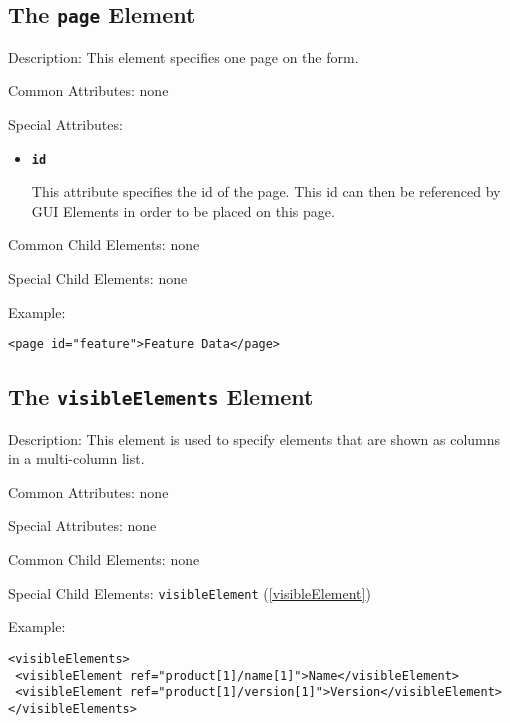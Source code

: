 \subsection{ The \texttt{page} Element}
\label{pageelement}
\begin{description}
 \item Description: This element specifies one page on the form.

 \item Common Attributes: none

 \item Special Attributes: 

\begin{itemize}
 \item \textbf{\texttt{id}}

This attribute specifies the id of the page. This id can then be referenced by GUI Elements in order to be placed on this page.
\end{itemize}


 \item Common Child Elements: none

 \item Special Child Elements: none

 \item Example: 

\begin{lstlisting}[caption=\texttt{page} Element]
<page id="feature">Feature Data</page>
\end{lstlisting}
\end{description}









\subsection{ The \texttt{visibleElements} Element}
\label{visibleElements}
\begin{description}
 \item Description: This element is used to specify elements that are shown as columns in a multi-column list.

 \item Common Attributes: none

 \item Special Attributes: none

 \item Common Child Elements: none

 \item Special Child Elements: \texttt{visibleElement} (\ref{visibleElement})

 \item Example: 

\begin{lstlisting}[caption=\texttt{visibleElements} Element]
<visibleElements>
 <visibleElement ref="product[1]/name[1]">Name</visibleElement>
 <visibleElement ref="product[1]/version[1]">Version</visibleElement>
</visibleElements>
\end{lstlisting}
\end{description}




